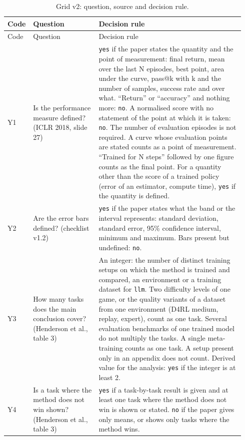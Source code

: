 \begin{small}
\begin{longtable}{@{}p{0.07\linewidth}>{\raggedright\arraybackslash}p{0.27\linewidth}>{\raggedright\arraybackslash}p{0.6\linewidth}@{}}
\caption{Grid v2: question, source and decision rule.}\label{tab:a-grille-y}\\
\toprule
Code & Question & Decision rule \\
\midrule
\endfirsthead
\toprule
Code & Question & Decision rule \\
\midrule
\endhead
\bottomrule
\endfoot
Y1 & Is the performance measure defined? (ICLR 2018, slide 27) & \texttt{yes} if the paper states
  the quantity and the point of measurement: final return, mean over the last N episodes, best point,
  area under the curve, pass@k with k and the number of samples, success rate and over what.
  \enquote{Return} or \enquote{accuracy} and nothing more: \texttt{no}. A normalised score with no
  statement of the point at which it is taken: \texttt{no}. The number of evaluation episodes is not
  required. A curve whose evaluation points are stated counts as a point of
  measurement. \enquote{Trained for N steps} followed by one figure counts as the final
  point. For a quantity other than the score of a trained policy (error of an estimator, compute
  time), \texttt{yes} if the quantity is defined. \\
Y2 & Are the error bars defined? (checklist v1.2) & \texttt{yes} if the paper states what the band
  or the interval represents: standard deviation, standard error, 95\% confidence interval, minimum
  and maximum. Bars present but undefined: \texttt{no}. \\
Y3 & How many tasks does the main conclusion cover? (Henderson et al., table 3) & An integer: the
  number of distinct training setups on which the method is trained and compared, an environment or
  a training dataset for \texttt{llm}. Two difficulty levels of one game, or the quality variants of
  a dataset from one environment (D4RL medium, replay, expert), count as one task. Several evaluation
  benchmarks of one trained model do not multiply the tasks. A single meta-training
  counts as one task. A setup present only in an appendix does not count. Derived
  value for the analysis: \texttt{yes} if the integer is at least 2. \\
Y4 & Is a task where the method does not win shown? (Henderson et al., table 3) & \texttt{yes} if a
  task-by-task result is given and at least one task where the method does not win is shown or
  stated. \texttt{no} if the paper gives only means, or shows only tasks where the method wins. \\

\end{longtable}
\end{small}
